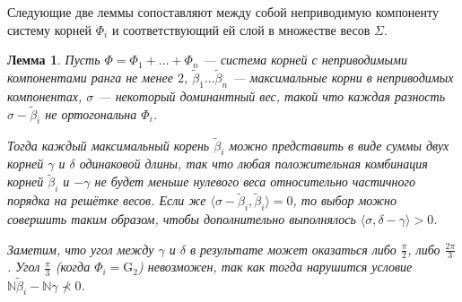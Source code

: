 \documentclass[12pt]{matmex-diploma}
\theoremstyle{mystyleni}
\theoremstyle{mystyle}
\newtheorem{lm}{Лемма}
\newcommand{\N}{\mathbb{N}}
\begin{document}
Следующие две леммы сопоставляют между собой неприводимую компоненту систему корней $\Phi_i$ и соответствующий ей слой в множестве весов $\Sigma$.

\begin{lm}\label{maxrootsum}
Пусть $\Phi=\Phi_1+\ldots+\Phi_n$ --- система корней с неприводимыми компонентами ранга не менее $2$, $\widetilde\beta_1 \ldots \widetilde\beta_n$ ---  максимальные корни в неприводимых компонентах, $\sigma$ --- некоторый доминантный вес, такой что каждая разность $\sigma-\widetilde\beta_i$ не ортогональна $\Phi_i$.

Тогда каждый максимальный корень $\widetilde\beta_i$ можно представить в виде суммы двух корней $\gamma$ и $\delta$ одинаковой длины, так что любая положительная комбинация корней $\widetilde\beta_i$ и $-\gamma$ не будет меньше нулевого веса относительно частичного порядка на решётке весов. Если же $\langle\sigma-\widetilde\beta_i,\widetilde\beta_i\rangle=0$, то выбор можно совершить таким образом, чтобы дополнительно выполнялось $\langle\sigma,\delta-\gamma\rangle>0$.

Заметим, что угол между $\gamma$ и $\delta$ в результате может оказаться либо $\frac{\pi}{2}$, либо $\frac{2\pi}{3}$. Угол $\frac{\pi}{3}$ (когда $\Phi_i = \mathrm{G}_2$) невозможен, так как тогда нарушится условие $\N\widetilde\beta_i-\N\gamma \nprec 0$.
\end{lm}
\end{document}
